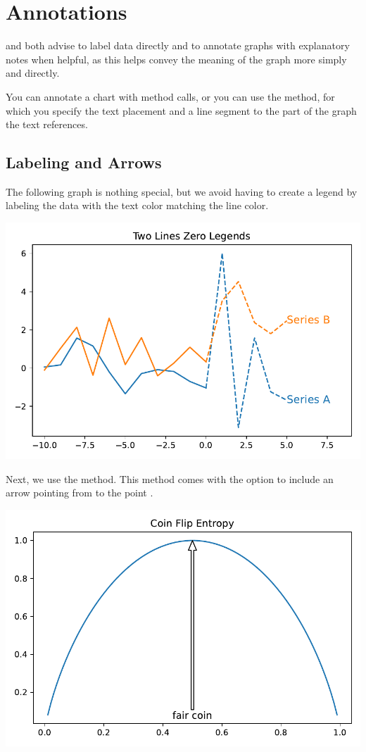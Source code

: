 \section{Annotations}

\cite{knaflic2015storytelling} and \cite{schwabish2021better} both advise to label data directly and to annotate graphs with explanatory notes when helpful, as this helps convey the meaning of the graph more simply and directly. 

You can annotate a chart with  method calls, or you can use the  method, for which you specify the text placement and a line segment to the part of the graph the text references. 


\subsection{Labeling and Arrows}

The following graph is nothing special, but we avoid having to create a legend by labeling the data with the text color matching the line color. 


\begin{center}
    \includegraphics[width = .7\textwidth]{figures/proseplots/label-data.pdf}
\end{center}


Next, we use the  method. This method comes with the option to include an arrow pointing from  to the point . 


\begin{center}
    \includegraphics[width = .7\textwidth]{figures/proseplots/annotate-arrow.pdf}
\end{center}


